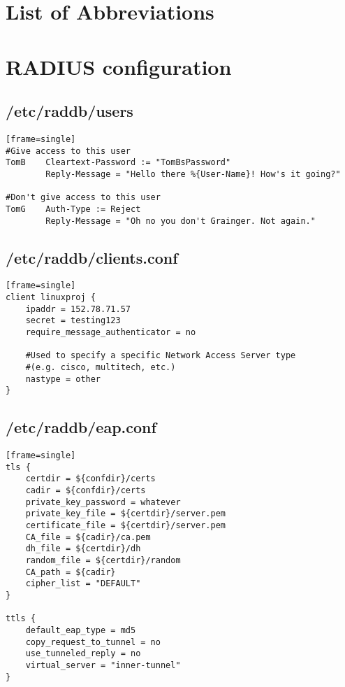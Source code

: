
\section{List of Abbreviations}
\renewcommand{\nomname}{}
\printnomenclature

\clearpage

\section{RADIUS configuration}
\label{sec:Code;sub:radius}

\subsection{/etc/raddb/users}
\begin{verbatim}[frame=single]
#Give access to this user
TomB    Cleartext-Password := "TomBsPassword"
        Reply-Message = "Hello there %{User-Name}! How's it going?"

#Don't give access to this user
TomG    Auth-Type := Reject
        Reply-Message = "Oh no you don't Grainger. Not again."
\end{verbatim}

\subsection{/etc/raddb/clients.conf}
\begin{verbatim}[frame=single]
client linuxproj {
    ipaddr = 152.78.71.57
    secret = testing123
    require_message_authenticator = no
    
    #Used to specify a specific Network Access Server type
    #(e.g. cisco, multitech, etc.)
    nastype = other
}
\end{verbatim}

\subsection{/etc/raddb/eap.conf}
\begin{verbatim}[frame=single]
tls {
    certdir = ${confdir}/certs
    cadir = ${confdir}/certs
    private_key_password = whatever
    private_key_file = ${certdir}/server.pem
    certificate_file = ${certdir}/server.pem
    CA_file = ${cadir}/ca.pem
    dh_file = ${certdir}/dh
    random_file = ${certdir}/random
    CA_path = ${cadir}
    cipher_list = "DEFAULT"
}

ttls {
    default_eap_type = md5
    copy_request_to_tunnel = no
    use_tunneled_reply = no
    virtual_server = "inner-tunnel"
}
\end{verbatim}

